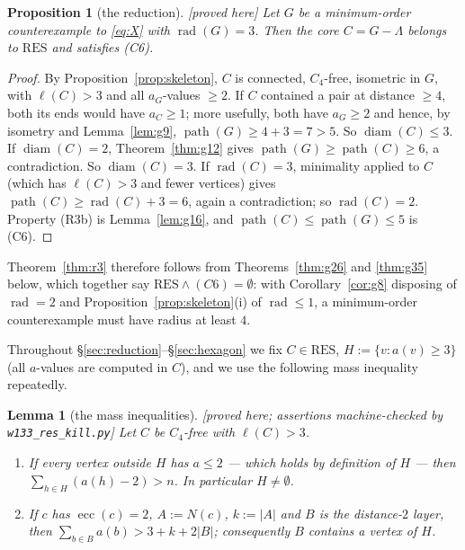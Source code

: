 \documentclass[11pt]{article}
\theoremstyle{plain}
\newtheorem{lemma}[theorem]{Lemma}
\newtheorem{proposition}[theorem]{Proposition}
\theoremstyle{definition}
\theoremstyle{remark}
\numberwithin{equation}{section}
\newcommand{\rad}{\operatorname{rad}}
\newcommand{\ecc}{\operatorname{ecc}}
\newcommand{\diam}{\operatorname{diam}}
\newcommand{\pth}{\operatorname{path}}
\newcommand{\statusbox}[1]{{\small\sloppy\textsf{[#1]}}}
\newcommand{\PRV}[1]{\statusbox{proved here; assertions machine-checked by \texttt{#1}}}
\newcommand{\PRVn}{\statusbox{proved here}}
\begin{document}
\begin{proposition}[the reduction]\label{prop:reduction}
\PRVn
Let $G$ be a minimum-order counterexample to \eqref{eq:X} with $\rad(G) = 3$. Then the core
$C = G - \Lambda$ belongs to $\mathrm{RES}$ and satisfies (C6).
\end{proposition}

\begin{proof}
By Proposition~\ref{prop:skeleton}, $C$ is connected, $C_4$-free, isometric in $G$, with
$\ell(C) > 3$ and all $a_G$-values $\ge 2$. If $C$ contained a pair at distance $\ge 4$, both
its ends would have $a_C \ge 1$; more usefully, both have $a_G \ge 2$ and hence, by isometry
and Lemma~\ref{lem:g9}, $\pth(G) \ge 4+3 = 7 > 5$. So $\diam(C) \le 3$. If $\diam(C) = 2$,
Theorem~\ref{thm:g12} gives $\pth(G) \ge \pth(C) \ge 6$, a contradiction. So $\diam(C) = 3$.
If $\rad(C) = 3$, minimality applied to $C$ (which has $\ell(C) > 3$ and fewer vertices)
gives $\pth(C) \ge \rad(C)+3 = 6$, again a contradiction; so $\rad(C) = 2$. Property (R3b)
is Lemma~\ref{lem:g16}, and $\pth(C) \le \pth(G) \le 5$ is (C6).
\end{proof}

Theorem~\ref{thm:r3} therefore follows from Theorems~\ref{thm:g26} and \ref{thm:g35} below,
which together say $\mathrm{RES} \wedge (C6) = \emptyset$: with
Corollary~\ref{cor:g8} disposing of $\rad = 2$ and Proposition~\ref{prop:skeleton}(i) of
$\rad \le 1$, a minimum-order counterexample must have radius at least $4$.

Throughout \S\ref{sec:reduction}--\S\ref{sec:hexagon} we fix $C \in \mathrm{RES}$,
$H := \{v : a(v) \ge 3\}$ (all $a$-values are computed in $C$), and we use the following
mass inequality repeatedly.

\begin{lemma}[the mass inequalities]\label{lem:mass}
\PRV{w133\_res\_kill.py}
Let $C$ be $C_4$-free with $\ell(C) > 3$.
\begin{enumerate}
\item[(a)] If every vertex outside $H$ has $a \le 2$ --- which holds by definition of $H$ ---
then $\sum_{h \in H}(a(h)-2) > n$. In particular $H \ne \emptyset$.
\item[(b)] If $c$ has $\ecc(c) = 2$, $A := N(c)$, $k := |A|$ and $B$ is the distance-$2$
layer, then $\sum_{b \in B} a(b) > 3 + k + 2|B|$; consequently $B$ contains a vertex of
$H$.
\end{enumerate}
\end{lemma}
\end{document}
